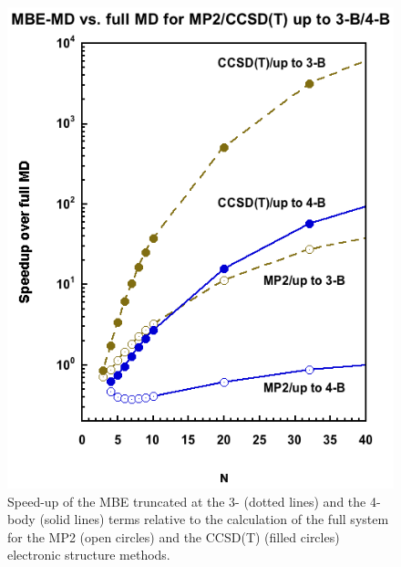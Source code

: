 \begin{figure}[h]
\uwsinglespace
\begin{center}
\begin{minipage}{0.5\textwidth}
\includegraphics[width=\textwidth]{Figures/Chapter_4/ch4_figure_2.png}
\end{minipage}
\end{center}
\caption[Speed-up of the MBE truncated at the 3- (dotted lines) and the 4-body (solid lines) terms relative to the calculation of the full system for the MP2 (open circles) and the CCSD(T) (filled circles) electronic structure methods.]{Speed-up of the MBE truncated at the 3- (dotted lines) and the 4-body (solid lines) terms relative to the calculation of the full system for the MP2 (open circles) and the CCSD(T) (filled circles) electronic structure methods.}
\label{fig:MBE_MD_F2}
\end{figure}